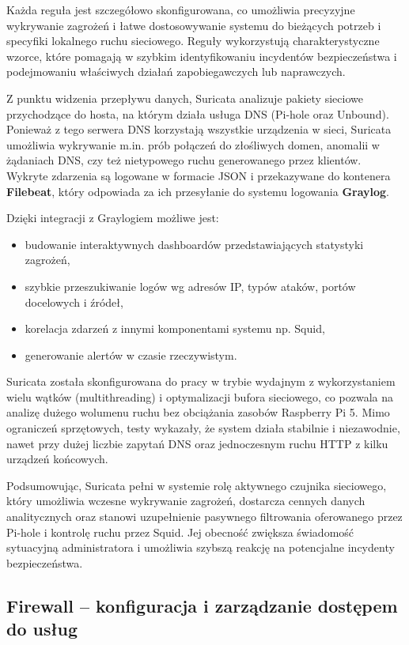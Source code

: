 \documentclass[
    left=2.5cm,         %
    right=2.5cm,        %
    top=2.5cm,          %
    bottom=3cm,         %
    bindingoffset=6mm,  %
    nohyphenation=true %
]{eiti/eiti-thesis} %
\begin{document}
Każda reguła jest szczegółowo skonfigurowana, co umożliwia precyzyjne wykrywanie zagrożeń i łatwe dostosowywanie systemu do bieżących potrzeb i specyfiki lokalnego ruchu sieciowego. Reguły wykorzystują charakterystyczne wzorce, które pomagają w szybkim identyfikowaniu incydentów bezpieczeństwa i podejmowaniu właściwych działań zapobiegawczych lub naprawczych. 

Z punktu widzenia przepływu danych, Suricata analizuje pakiety sieciowe przychodzące do hosta, na którym działa usługa DNS (Pi-hole oraz Unbound). Ponieważ z tego serwera DNS korzystają wszystkie urządzenia w sieci, Suricata umożliwia wykrywanie m.in. prób połączeń do złośliwych domen, anomalii w żądaniach DNS, czy też nietypowego ruchu generowanego przez klientów. Wykryte zdarzenia są logowane w formacie JSON i przekazywane do kontenera \textbf{Filebeat}, który odpowiada za ich przesyłanie do systemu logowania \textbf{Graylog}.


Dzięki integracji z Graylogiem możliwe jest:
\begin{itemize}
    \item budowanie interaktywnych dashboardów przedstawiających statystyki zagrożeń,
    \item szybkie przeszukiwanie logów wg adresów IP, typów ataków, portów docelowych i źródeł,
    \item korelacja zdarzeń z innymi komponentami systemu np. Squid,
    \item generowanie alertów w czasie rzeczywistym.
\end{itemize}

Suricata została skonfigurowana do pracy w trybie wydajnym z wykorzystaniem wielu wątków (multithreading) i optymalizacji bufora sieciowego, co pozwala na analizę dużego wolumenu ruchu bez obciążania zasobów Raspberry Pi 5. Mimo ograniczeń sprzętowych, testy wykazały, że system działa stabilnie i niezawodnie, nawet przy dużej liczbie zapytań DNS oraz jednoczesnym ruchu HTTP z kilku urządzeń końcowych.

Podsumowując, Suricata pełni w systemie rolę aktywnego czujnika sieciowego, który umożliwia wczesne wykrywanie zagrożeń, dostarcza cennych danych analitycznych oraz stanowi uzupełnienie pasywnego filtrowania oferowanego przez Pi-hole i kontrolę ruchu przez Squid. Jej obecność zwiększa świadomość sytuacyjną administratora i umożliwia szybszą reakcję na potencjalne incydenty bezpieczeństwa.

\subsection{Firewall – konfiguracja i zarządzanie dostępem do usług}
\end{document}
